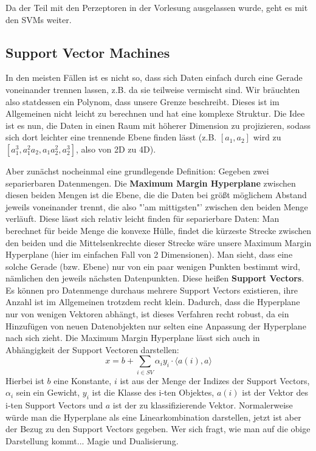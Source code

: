 Da der Teil mit den Perzeptoren in der Vorlesung ausgelassen wurde, geht 
es mit den SVMs weiter.

\subsection{Support Vector Machines}
In den meisten Fällen ist es nicht so, dass sich Daten einfach durch
eine Gerade voneinander trennen lassen, z.B. da sie teilweise vermischt 
sind. Wir bräuchten also statdessen ein Polynom, dass unsere Grenze 
beschreibt. Dieses ist im Allgemeinen nicht leicht zu berechnen und hat
eine komplexe Struktur. Die Idee ist es nun, die Daten in einen Raum
mit höherer Dimension zu projizieren, sodass sich dort leichter
eine trennende Ebene finden lässt (z.B. \([a_1,a_2]\) wird zu
\([a_1^3,a_1^2 a_2, a_1 a_2^2, a_2^3]\), also von 2D zu 4D).

Aber zunächst nocheinmal eine grundlegende Definition:
Gegeben zwei separierbaren Datenmengen. Die \textbf{Maximum
Margin Hyperplane} zwischen diesen beiden Mengen ist die Ebene, die
die Daten bei größt möglichem Abstand jeweils voneinander trennt, die 
also "'am mittigsten"' zwischen den beiden Menge verläuft. Diese lässt
sich relativ leicht finden für separierbare Daten: Man berechnet für beide
Menge die konvexe Hülle, findet die kürzeste Strecke zwischen den
beiden und die Mittelsenkrechte dieser Strecke wäre unsere Maximum
Margin Hyperplane (hier im einfachen Fall von 2 Dimensionen). Man sieht,
dass eine solche Gerade (bzw. Ebene) nur von ein paar wenigen Punkten
bestimmt wird, nämlichen den jeweils nächsten Datenpunkten.
Diese heißen \textbf{Support Vectors}. Es können pro Datenmenge
durchaus mehrere Support Vectors existieren, ihre Anzahl ist im 
Allgemeinen trotzdem recht klein. Dadurch, dass die Hyperplane nur von
wenigen Vektoren abhängt, ist dieses Verfahren recht robust, da 
ein Hinzufügen von neuen Datenobjekten nur selten eine Anpassung
der Hyperplane nach sich zieht. Die Maximum Margin Hyperplane lässt
sich auch in Abhängigkeit der Support Vectoren darstellen:
\[x = b + \sum _{i \in SV} \alpha_i y_i \cdot \langle a(i),a \rangle\]
Hierbei ist \(b\) eine Konstante, \(i\) ist aus der Menge der Indizes 
der Support Vectors, \(\alpha_i\) sein ein Gewicht, \(y_i\) ist die 
Klasse des i-ten Objektes, \(a(i)\) ist der Vektor des i-ten Support 
Vectors und \(a\) ist der zu klassifizierende Vektor. Normalerweise
würde man die Hyperplane als eine Linearkombination darstellen, jetzt
ist aber der Bezug zu den Support Vectors gegeben. Wer sich fragt,
wie man auf die obige Darstellung kommt... Magie und Dualisierung.

